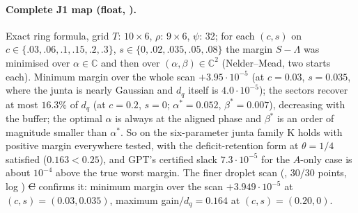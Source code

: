 \documentclass[11pt,a4paper]{article}
\newcommand{\C}{\mathbb{C}}\newcommand{\R}{\mathbb{R}}\newcommand{\E}{\mathbb{E}}\newcommand{\Hc}[2]{H_{#1,#2}}
\begin{document}
\paragraph{Complete J1 map (float, ).} Exact ring formula, grid $T$: $10\times6$, $\rho$: $9\times6$, $\psi$: 32; for each $(c,s)$ on
$c\in\{.03,.06,.1,.15,.2,.3\}$, $s\in\{0,.02,.035,.05,.08\}$ the margin $S-\Lambda$ was minimised over $\alpha\in\C$ and then over $(\alpha,\beta)\in\C^2$ (Nelder--Mead, two starts
each). Minimum margin over the whole scan $+3.95\cdot10^{-5}$ (at $c=0.03$, $s=0.035$, where the junta is nearly Gaussian and $d_q$ itself is $4.0\cdot10^{-5}$); the sectors recover at most
$16.3\%$ of $d_q$ (at $c=0.2$, $s=0$; $\alpha^*=0.052$, $\beta^*=0.007$), decreasing with the buffer; the optimal $\alpha$ is always at the aligned phase and $\beta^*$ is an order of
magnitude smaller than $\alpha^*$. So on the six-parameter junta family K holds with positive margin everywhere tested, with the deficit-retention form at $\theta=1/4$ satisfied
($0.163<0.25$), and GPT's certified slack $7.3\cdot10^{-5}$ for the $A$-only case is about $10^{-4}$ above the true worst margin. The finer droplet scan (, 30/30 points, log ) \st{C} confirms it: minimum margin over the scan $+3.949\cdot10^{-5}$ at $(c,s)=(0.03,0.035)$, maximum gain$/d_q=0.164$ at $(c,s)=(0.20,0)$.
\end{document}
